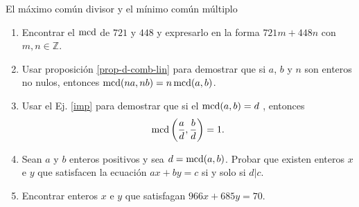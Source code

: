 \begin{section}{El máximo común divisor y el mínimo común
múltiplo}
\begin{enumerate}
\item Encontrar el $\operatorname{mcd}$ de $721$ y $448$ y expresarlo en la forma
$721m+448n$ con $m,n \in \mathbb Z$.
\item\label{imp} Usar  proposición \ref{prop-d-comb-lin} para demostrar que si $a$, $b$ y $n$ son enteros no nulos, entonces
$\operatorname{mcd}(na,nb)=n\operatorname{mcd}(a,b)$.
\item Usar el  Ej. \ref{imp} para demostrar que si el
$\operatorname{mcd}(a,b)=d$ , entonces
$$
\operatorname{mcd}\left(\frac{a}{d},\frac{b}{d}\right) =1.
$$
\item  Sean $a$ y $b$ enteros positivos y sea $d=\operatorname{mcd}(a,b)$. Probar que existen
enteros $ x$ e $y$ que satisfacen la ecuación $ax+by=c$ si y solo
si $d|c$.
\item  Encontrar enteros $x$ e $y$ que satisfagan $966x+685y=70.$
\end{enumerate}


\end{section}



